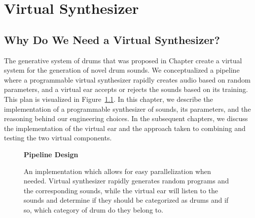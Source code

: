 \documentclass[\main/thesis.tex]{subfiles}
\begin{document}
\chapter{Virtual Synthesizer}
\label{chap:virt_synth}
\section{Why Do We Need a Virtual Synthesizer?}
The generative system of drums that was proposed in Chapter create a virtual system for the generation of novel drum sounds. We conceptualized a pipeline where a programmable virtual synthesizer rapidly creates audio based on random parameters, and a virtual ear accepts or rejects the sounds based on its training. This plan is visualized in  Figure~\ref{fig:pipeline_outline}. In this chapter, we describe the implementation of a programmable synthesizer of sounds, its parameters, and the reasoning behind our engineering choices. In the subsequent chapters, we discuss the implementation of the virtual ear and the approach taken to combining and testing the two virtual components. 
\label{vs}
 \begin{figure}[h!]
    \begin{center}
    \textbf{Pipeline Design}
    \end{center}
    \caption{An implementation which allows for easy parallelization when needed. Virtual synthesizer rapidly generates random programs and the corresponding sounds, while the virtual ear will listen to the sounds and determine if they should be categorized as drums and if so, which category of drum do they belong to. 
    }
\label{fig:pipeline_outline}
\end{figure}
\end{document}
